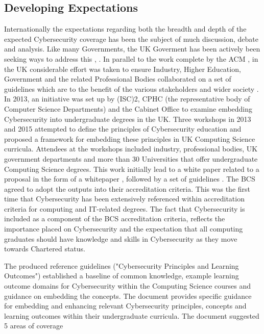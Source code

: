 \documentclass[conference]{IEEEtran}
\begin{document}
\subsection{Developing Expectations}
Internationally the expectations regarding both the breadth and depth of the expected Cybersecurity coverage has been the subject of much discussion, debate and analysis. Like many Governments, the UK Goverment has been actively been seeking ways to address this \cite{UKCabinetOffice}, \cite{UKCabinetOffice2014}. In parallel to the work complete by the ACM \cite{ACM2013a}, in the UK considerable effort was taken to ensure Industry, Higher Education, Government and the related Professional Bodies collaborated on a set of guidelines which are to the benefit of the various stakeholders and wider society \cite{Irons2016}. In 2013, an initiative was set up by (ISC)2, CPHC (the representative body of Computer Science Departments) and the Cabinet Office to examine embedding Cybersecurity into undergraduate degrees in the UK. Three workshops in 2013 and 2015 attempted to define the principles of Cybersecurity education and proposed a framework for embedding these principles in UK Computing Science curricula. Attendees at the workshops included industry, professional bodies, UK government departments and more than 30 Universities that offer undergraduate Computing Science degrees. This work initially lead to a white paper related to a proposal in the form of a whitepaper \cite{CPHCISC2014}, followed by a set of guidelines \cite{CPHCISC2}. The BCS agreed to adopt the outputs into their accreditation criteria. This was the first time that Cybersecurity has been extensively referenced within accreditation criteria for computing and IT-related degrees. The fact that Cybersecurity is included as a  component of the BCS accreditation criteria, reflects the importance placed on Cybersecurity and the expectation that all computing graduates should have knowledge and skills in Cybersecurity as they move towards Chartered status.

The produced reference guidelines ("Cybersecurity Principles and Learning Outcomes") \cite{CPHCISC2} established a baseline of common knowledge, example learning outcome domains for Cybersecurity within the Computing Science courses and guidance on embedding the concepts. The document provides specific guidance for embedding and enhancing relevant Cybersecurity principles, concepts and learning outcomes within their undergraduate curricula. The document suggested 5 areas of coverage 
\end{document}
